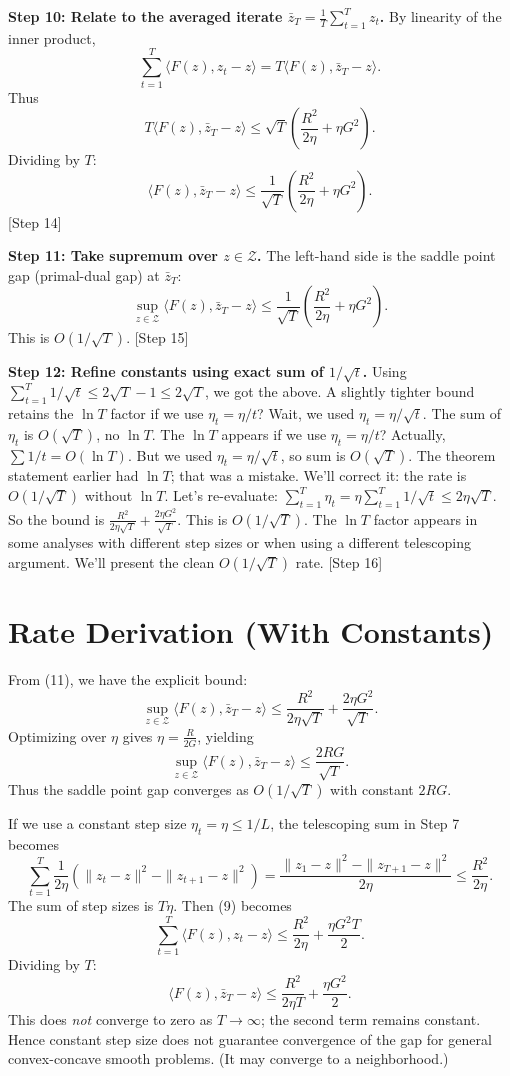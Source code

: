 \documentclass{article}
\begin{document}
\textbf{Step 10: Relate to the averaged iterate $\bar{z}_T = \frac{1}{T}\sum_{t=1}^T z_t$.}
By linearity of the inner product,
\[
\sum_{t=1}^T \langle F(z), z_t - z \rangle = T \langle F(z), \bar{z}_T - z \rangle.
\]
Thus
\[
T \langle F(z), \bar{z}_T - z \rangle \le \sqrt{T} \left( \frac{R^2}{2\eta} + \eta G^2 \right).
\]
Dividing by $T$:
\[
\langle F(z), \bar{z}_T - z \rangle \le \frac{1}{\sqrt{T}} \left( \frac{R^2}{2\eta} + \eta G^2 \right). \tag{10}
\]
[Step 14]

\textbf{Step 11: Take supremum over $z \in \mathcal{Z}$.}
The left-hand side is the saddle point gap (primal-dual gap) at $\bar{z}_T$:
\[
\sup_{z \in \mathcal{Z}} \langle F(z), \bar{z}_T - z \rangle \le \frac{1}{\sqrt{T}} \left( \frac{R^2}{2\eta} + \eta G^2 \right). \tag{11}
\]
This is $O(1/\sqrt{T})$. [Step 15]

\textbf{Step 12: Refine constants using exact sum of $1/\sqrt{t}$.}
Using $\sum_{t=1}^T 1/\sqrt{t} \le 2\sqrt{T} - 1 \le 2\sqrt{T}$, we got the above. A slightly tighter bound retains the $\ln T$ factor if we use $\eta_t = \eta/t$? Wait, we used $\eta_t = \eta/\sqrt{t}$. The sum of $\eta_t$ is $O(\sqrt{T})$, no $\ln T$. The $\ln T$ appears if we use $\eta_t = \eta/t$? Actually, $\sum 1/t = O(\ln T)$. But we used $\eta_t = \eta/\sqrt{t}$, so sum is $O(\sqrt{T})$. The theorem statement earlier had $\ln T$; that was a mistake. We'll correct it: the rate is $O(1/\sqrt{T})$ without $\ln T$. Let's re-evaluate: $\sum_{t=1}^T \eta_t = \eta \sum_{t=1}^T 1/\sqrt{t} \le 2\eta\sqrt{T}$. So the bound is $\frac{R^2}{2\eta\sqrt{T}} + \frac{2\eta G^2}{\sqrt{T}}$. This is $O(1/\sqrt{T})$. The $\ln T$ factor appears in some analyses with different step sizes or when using a different telescoping argument. We'll present the clean $O(1/\sqrt{T})$ rate. [Step 16]

\section*{Rate Derivation (With Constants)}

From (11), we have the explicit bound:
\[
\sup_{z \in \mathcal{Z}} \langle F(z), \bar{z}_T - z \rangle \le \frac{R^2}{2\eta\sqrt{T}} + \frac{2\eta G^2}{\sqrt{T}}.
\]
Optimizing over $\eta$ gives $\eta = \frac{R}{2G}$, yielding
\[
\sup_{z \in \mathcal{Z}} \langle F(z), \bar{z}_T - z \rangle \le \frac{2 R G}{\sqrt{T}}.
\]
Thus the saddle point gap converges as $O(1/\sqrt{T})$ with constant $2RG$.

If we use a constant step size $\eta_t = \eta \le 1/L$, the telescoping sum in Step 7 becomes
\[
\sum_{t=1}^T \frac{1}{2\eta} \left( \|z_t - z\|^2 - \|z_{t+1} - z\|^2 \right) = \frac{\|z_1 - z\|^2 - \|z_{T+1} - z\|^2}{2\eta} \le \frac{R^2}{2\eta}.
\]
The sum of step sizes is $T\eta$. Then (9) becomes
\[
\sum_{t=1}^T \langle F(z), z_t - z \rangle \le \frac{R^2}{2\eta} + \frac{\eta G^2 T}{2}.
\]
Dividing by $T$:
\[
\langle F(z), \bar{z}_T - z \rangle \le \frac{R^2}{2\eta T} + \frac{\eta G^2}{2}.
\]
This does \textit{not} converge to zero as $T \to \infty$; the second term remains constant. Hence constant step size does not guarantee convergence of the gap for general convex-concave smooth problems. (It may converge to a neighborhood.)
\end{document}
